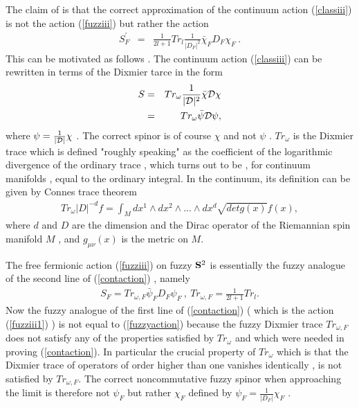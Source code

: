 \documentclass[a4paper,10pt]{article}
\begin{document}
The claim of \cite{denjoe} is that the correct approximation of the continuum action (\ref{classiii}) is not the action (\ref{fuzziii}) but rather the action
\begin{eqnarray}
S_F^{'}&=&\frac{1}{2l+1}Tr_{l}\frac{1}{|D_F|^2}\bar{{\chi}}_F{D}_F{\chi}_F~                                .\label{fuzziii1}
\end{eqnarray}
This can be motivated as follows . The continuum action (\ref{classiii}) can be rewritten in terms of the Dixmier tarce in the form\cite{cmlv}
\begin{eqnarray}
S&=&Tr_{\omega}\frac{1}{|{\cal D}|^2}\bar{\chi}{\cal D}{\chi}\nonumber\\
&=&Tr_{\omega}\bar{\psi}{\cal
D}{\psi},\label{contaction}
\end{eqnarray}
where ${\psi}=\frac{1}{|{\cal
D}|}{\chi}$ .
The correct spinor is of course ${\chi}$ and not
${\psi}$ . $Tr_{\omega}$ is the Dixmier trace which is defined "roughly
speaking" as the coefficient of the logarithmic divergence of the
ordinary trace , which turns out to be , for continuum manifolds
, equal to the ordinary integral. In the continuum, its
definition can be given by Connes trace theorem \cite{cmlv}
\begin{eqnarray}
Tr_{\omega}|D|^{-d}f=\int_{M}dx^1{\wedge}dx^2{\wedge}...{\wedge}dx^{d}\sqrt{detg(x)}f(x),\nonumber
\end{eqnarray}
where $d$ and $D$ are the dimension and the Dirac operator of the
Riemannian spin manifold $M$ , and $g_{{\mu}{\nu}}(x)$ is the
metric on $M$.

The free fermionic action (\ref{fuzziii}) on fuzzy ${\bf S}^2$ is essentially
the fuzzy analogue of the second line of (\ref{contaction}) ,
namely
\begin{eqnarray}
S_F=Tr_{\omega,F}\bar{{\psi}}_F{D}_F{\psi}_F~,~Tr_{\omega,F}=\frac{1}{2l+1}Tr_l.\label{fuzzyaction}
\end{eqnarray}
Now the fuzzy analogue of the first line of (\ref{contaction}) ( which is the action (\ref{fuzziii1})  ) is
not equal to (\ref{fuzzyaction}) because the fuzzy Dixmier trace
$Tr_{\omega,F}$ does not satisfy any of the properties satisfied
by $Tr_{\omega}$ and which were needed in proving
(\ref{contaction}). In particular the crucial property of
$Tr_{\omega}$ which is that the Dixmier trace of operators of
order higher than one vanishes identically , is not satisfied by
$Tr_{\omega,F}$. The
correct noncommutative fuzzy spinor when approaching the limit is therefore not  ${\psi}_F$ but rather ${\chi}_F$ defined by $
{\psi}_F=\frac{1}{|{    D}_F|}{\chi}_F$ .
\end{document}
